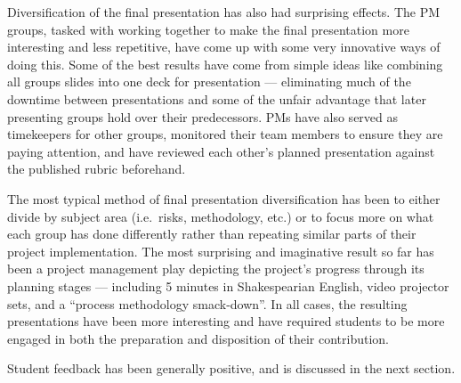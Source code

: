 \documentclass{sig-alternate}
\begin{document}
Diversification of the final presentation has also had surprising effects. The PM groups, tasked with
working together to make the final presentation more interesting and less repetitive, have come up with
some very innovative ways of doing this. Some of the best results have come from simple ideas like
combining all groups slides into one deck for presentation --- eliminating much of the downtime between
presentations and some of the unfair advantage that later presenting groups hold over their predecessors. PMs have also
served as timekeepers for other groups, monitored their team members to ensure they are paying attention, and 
have reviewed each other's planned presentation against the published rubric beforehand.

The most typical method of final presentation diversification has been to either divide by subject area
(i.e.\ risks, methodology, etc.) or to focus more on what each group has done differently rather than
repeating similar parts of their project implementation. The most surprising and imaginative
result so far has been a project management play depicting the project's progress through its planning
stages --- including 5 minutes in Shakespearian English, video projector sets, and a ``process methodology
smack-down''. In all cases, the resulting presentations have been more interesting and have required
students to be more engaged in both the preparation and disposition of their contribution.

Student feedback has been generally positive, and is discussed in the next section.
\end{document}
